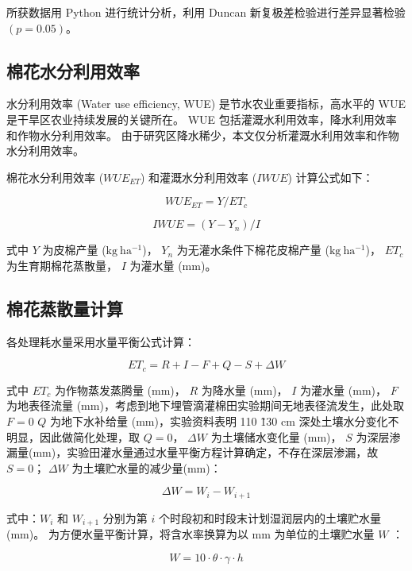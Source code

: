 所获数据用 Python 进行统计分析，利用 Duncan 新复极差检验进行差异显著检验 $(p = 0.05)$。

\subsection{棉花水分利用效率}
水分利用效率 (Water use efficiency, WUE) 是节水农业重要指标，高水平的 WUE 是干旱区农业持续发展的关键所在。
WUE 包括灌溉水利用效率，降水利用效率和作物水分利用效率。
由于研究区降水稀少，本文仅分析灌溉水利用效率和作物水分利用效率。

棉花水分利用效率 ($WUE_{ET}$) 和灌溉水分利用效率 ($IWUE$) 计算公式如下：

\begin{equation}
    WUE_{ET} = Y / ET_c
\end{equation}

\begin{equation}
    IWUE = (Y - Y_n) / I
\end{equation}

式中 $Y$ 为皮棉产量 ($\mathrm{kg\ ha^{-1}}$)，
$Y_n$ 为无灌水条件下棉花皮棉产量 ($\mathrm{kg\ ha^{-1}}$)，
$ET_c$ 为生育期棉花蒸散量，
$I$ 为灌水量 (mm)。
\subsection{棉花蒸散量计算}

各处理耗水量采用水量平衡公式计算：

\begin{equation}
    ET_c = R + I - F + Q - S + \Delta W
\end{equation}

式中 $ET_c$ 为作物蒸发蒸腾量 (mm)，
$R$ 为降水量 (mm)，
$I$ 为灌水量 (mm)，
$F$ 为地表径流量 (mm)，考虑到地下埋管滴灌棉田实验期间无地表径流发生，此处取 $F = 0$
$Q$ 为地下水补给量 (mm)，实验资料表明 110 \~ 130 cm 深处土壤水分变化不明显，因此做简化处理，取 $Q = 0$，
$\Delta W$ 为土壤储水变化量 (mm)，
$S$ 为深层渗漏量(mm)，实验田灌水量通过水量平衡方程计算确定，不存在深层渗漏，故 $S=0$；
$\Delta W$ 为土壤贮水量的减少量(mm)：

\begin{equation}
    \Delta W = W_i - W_{i+1}
\end{equation}

式中：$W_i$ 和 $W_{i+1}$ 分别为第 $i$ 个时段初和时段末计划湿润层内的土壤贮水量 (mm)。
为方便水量平衡计算，将含水率换算为以 mm 为单位的土壤贮水量 $W$ ：

\begin{equation}
    W = 10 \cdot \theta \cdot \gamma \cdot h
\end{equation}

